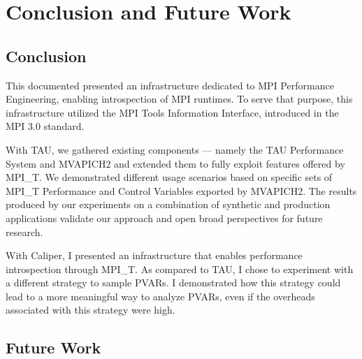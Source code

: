 \chapter{Conclusion and Future Work}
\section{Conclusion}
This documented presented an infrastructure dedicated to MPI Performance Engineering, enabling introspection of MPI runtimes.
To serve that purpose, this infrastructure utilized the MPI Tools Information Interface, introduced in the MPI 3.0 standard.
\par With TAU, we gathered existing components --- namely the TAU Performance System and MVAPICH2 and extended them to fully exploit features offered by MPI\_T. We demonstrated different usage scenarios based on specific sets of MPI\_T Performance and Control Variables exported by MVAPICH2. The results produced by our experiments on a combination of synthetic and production applications validate our approach and open broad perspectives for future research.
\par With Caliper, I presented an infrastructure that enables performance introspection through MPI\_T. As compared to TAU, I chose to experiment with a different strategy to sample PVARs. I demonstrated how this strategy could lead to a more meaningful way to analyze PVARs, even if the overheads associated with this strategy were high.
\section{Future Work}
